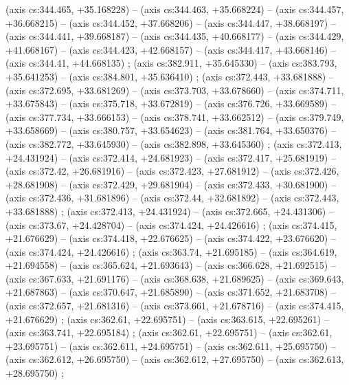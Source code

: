   (axis cs:344.465,    +35.168228) --  (axis cs:344.463,    +35.668224) --  (axis cs:344.457,    +36.668215) --  (axis cs:344.452,    +37.668206) --  (axis cs:344.447,    +38.668197) --  (axis cs:344.441,    +39.668187) --  (axis cs:344.435,    +40.668177) --  (axis cs:344.429,    +41.668167) --  (axis cs:344.423,    +42.668157) --  (axis cs:344.417,    +43.668146) --  (axis cs:344.41,    +44.668135) ;
    (axis cs:382.911,    +35.645330) --  (axis cs:383.793,    +35.641253) --  (axis cs:384.801,    +35.636410) ;
    (axis cs:372.443,    +33.681888) --  (axis cs:372.695,    +33.681269) --  (axis cs:373.703,    +33.678660) --  (axis cs:374.711,    +33.675843) --  (axis cs:375.718,    +33.672819) --  (axis cs:376.726,    +33.669589) --  (axis cs:377.734,    +33.666153) --  (axis cs:378.741,    +33.662512) --  (axis cs:379.749,    +33.658669) --  (axis cs:380.757,    +33.654623) --  (axis cs:381.764,    +33.650376) --  (axis cs:382.772,    +33.645930) --  (axis cs:382.898,    +33.645360) ;
    (axis cs:372.413,    +24.431924) --  (axis cs:372.414,    +24.681923) --  (axis cs:372.417,    +25.681919) --  (axis cs:372.42,    +26.681916) --  (axis cs:372.423,    +27.681912) --  (axis cs:372.426,    +28.681908) --  (axis cs:372.429,    +29.681904) --  (axis cs:372.433,    +30.681900) --  (axis cs:372.436,    +31.681896) --  (axis cs:372.44,    +32.681892) --  (axis cs:372.443,    +33.681888) ;
    (axis cs:372.413,    +24.431924) --  (axis cs:372.665,    +24.431306) --  (axis cs:373.67,    +24.428704) --  (axis cs:374.424,    +24.426616) ;
    (axis cs:374.415,    +21.676629) --  (axis cs:374.418,    +22.676625) --  (axis cs:374.422,    +23.676620) --  (axis cs:374.424,    +24.426616) ;
    (axis cs:363.74,    +21.695185) --  (axis cs:364.619,    +21.694558) --  (axis cs:365.624,    +21.693643) --  (axis cs:366.628,    +21.692515) --  (axis cs:367.633,    +21.691176) --  (axis cs:368.638,    +21.689625) --  (axis cs:369.643,    +21.687863) --  (axis cs:370.647,    +21.685890) --  (axis cs:371.652,    +21.683708) --  (axis cs:372.657,    +21.681316) --  (axis cs:373.661,    +21.678716) --  (axis cs:374.415,    +21.676629) ;
    (axis cs:362.61,    +22.695751) --  (axis cs:363.615,    +22.695261) --  (axis cs:363.741,    +22.695184) ;
    (axis cs:362.61,    +22.695751) --  (axis cs:362.61,    +23.695751) --  (axis cs:362.611,    +24.695751) --  (axis cs:362.611,    +25.695750) --  (axis cs:362.612,    +26.695750) --  (axis cs:362.612,    +27.695750) --  (axis cs:362.613,    +28.695750) ;
